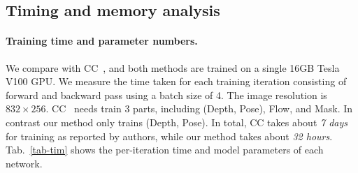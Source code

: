 \documentclass{article}
\newcommand{\tabref}[1]{Tab.~\ref{#1}}
\begin{document}
\begin{table}[ht]
\centering
    \caption{Ablation studies on different network architectures and image resolutions.}
    \label{tab:ablation3}
    \vspace{-2mm}    
\end{table}





\subsection{Timing and memory analysis}


\paragraph{Training time and parameter numbers.}
We compare with CC~\cite{ranjan2019cc}, and both methods are trained on a single 16GB Tesla V100 GPU.
We measure the time taken for each training iteration consisting of forward and backward pass using a batch size of 4.
The image resolution is $832 \times 256$.
CC~\cite{ranjan2019cc} needs train 3 parts, including (Depth, Pose), Flow, and Mask.
In contrast our method only trains (Depth, Pose).
In total, CC takes about \emph{7 days} for training as reported by authors, while our method takes about \emph{32 hours}.
\tabref{tab-tim} shows the per-iteration time and model parameters of each network.
\end{document}
